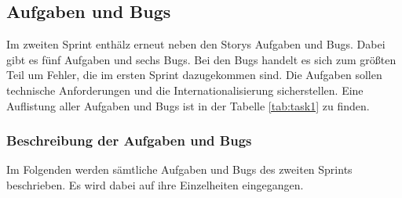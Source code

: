 \subsection{Aufgaben und Bugs}
Im zweiten Sprint enthälz erneut neben den Storys Aufgaben und Bugs. Dabei gibt es fünf Aufgaben und sechs Bugs. Bei den Bugs handelt es sich zum größten Teil um Fehler, die im ersten Sprint dazugekommen sind. Die Aufgaben sollen technische Anforderungen und die Internationalisierung sicherstellen.
Eine Auflistung aller Aufgaben und Bugs ist in der Tabelle \ref{tab:task1} zu finden.

\subsubsection{Beschreibung der Aufgaben und Bugs}
Im Folgenden werden sämtliche Aufgaben und Bugs des zweiten Sprints beschrieben. Es wird dabei auf ihre Einzelheiten eingegangen.


